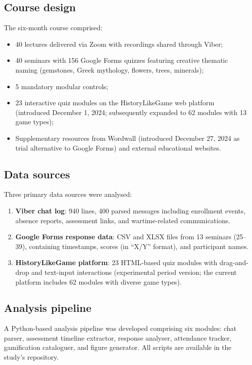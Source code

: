 \documentclass[review]{elsarticle}
\begin{document}
\subsection{Course design}

The six-month course comprised:
\begin{itemize}
\item 40 lectures delivered via Zoom with recordings shared through Viber;
\item 40 seminars with 156 Google Forms quizzes featuring creative thematic naming (gemstones, Greek mythology, flowers, trees, minerals);
\item 5 mandatory modular controls;
\item 23 interactive quiz modules on the HistoryLikeGame web platform (introduced December 1, 2024; subsequently expanded to 62 modules with 13 game types);
\item Supplementary resources from Wordwall (introduced December 27, 2024 as trial alternative to Google Forms) and external educational websites.
\end{itemize}

\subsection{Data sources}

Three primary data sources were analysed:
\begin{enumerate}
\item \textbf{Viber chat log}: 940 lines, 400 parsed messages including enrollment events, absence reports, assessment links, and wartime-related communications.
\item \textbf{Google Forms response data}: CSV and XLSX files from 13 seminars (25--39), containing timestamps, scores (in ``X/Y'' format), and participant names.
\item \textbf{HistoryLikeGame platform}: 23 HTML-based quiz modules with drag-and-drop and text-input interactions (experimental period version; the current platform includes 62 modules with diverse game types).
\end{enumerate}

\subsection{Analysis pipeline}

A Python-based analysis pipeline was developed comprising six modules: chat parser, assessment timeline extractor, response analyser, attendance tracker, gamification cataloguer, and figure generator. All scripts are available in the study's repository.
\end{document}
